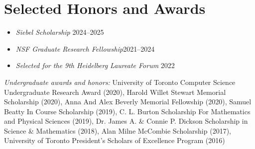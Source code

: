 \documentclass{article}
\begin{document}
    \section{Selected Honors and  Awards}
    \begin{itemize}
     \setlength\itemsep{.8ex}
     	\item \textsl{Siebel Scholarship} \hfill 2024--2025
     	\item \textsl{NSF Graduate Research Fellowship}\hfill 2021--2024
     	\item \textsl{Selected for the 9th Heidelberg Laureate Forum} \hfill 2022
    \end{itemize}
    \emph{Undergraduate awards and honors:} University of Toronto Computer Science Undergraduate Research Award (2020), Harold Willet Stewart Memorial Scholarship (2020), Anna And Alex Beverly Memorial Fellowship (2020), Samuel Beatty In Course Scholarship (2019), C. L. Burton Scholarship For Mathematics and Physical Sciences (2019), Dr. James A. \& Connie P. Dickson Scholarship in Science \& Mathematics (2018), Alan Milne McCombie Scholarship (2017), University of Toronto President's Scholars of Excellence Program (2016)
\end{document}
